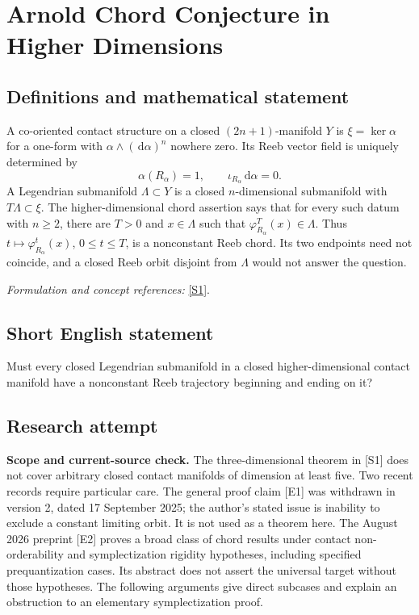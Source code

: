 \documentclass[11pt]{article}
\begin{document}
\section*{\texorpdfstring{Arnold Chord Conjecture in Higher Dimensions}{Arnold Chord Conjecture in Higher Dimensions}}\label{statement}
\subsection{Definitions and mathematical statement}
A co-oriented contact structure on a closed $(2n+1)$-manifold $Y$ is $\xi=\ker\alpha$ for a one-form with $\alpha\wedge({\,\mathrm{d}}\alpha)^n$ nowhere zero. Its Reeb vector field is uniquely determined by
\[
 \alpha(R_\alpha)=1,\qquad \iota_{R_\alpha}{\,\mathrm{d}}\alpha=0.
\]
A Legendrian submanifold $\Lambda\subset Y$ is a closed $n$-dimensional submanifold with $T\Lambda\subset\xi$. The higher-dimensional chord assertion says that for every such datum with $n\ge2$, there are $T>0$ and $x\in\Lambda$ such that $\varphi_{R_\alpha}^T(x)\in\Lambda$. Thus $t\mapsto\varphi_{R_\alpha}^t(x)$, $0\le t\le T$, is a nonconstant Reeb chord. Its two endpoints need not coincide, and a closed Reeb orbit disjoint from $\Lambda$ would not answer the question.
\par\smallskip\textit{Formulation and concept references:} \href{https://arxiv.org/abs/1004.4319}{[S1]}.

\subsection{Short English statement}
Must every closed Legendrian submanifold in a closed higher-dimensional contact manifold have a nonconstant Reeb trajectory beginning and ending on it?
\subsection{Research attempt}
\textbf{Scope and current-source check.}
The three-dimensional theorem in [S1] does not cover arbitrary closed contact
manifolds of dimension at least five.  Two recent records require particular
care.  The general proof claim [E1] was withdrawn in version 2, dated
17 September 2025; the author's stated issue is inability to exclude a
constant limiting orbit.  It is not used as a theorem here.  The August 2026
preprint [E2] proves a broad class of chord results under contact
non-orderability and symplectization rigidity hypotheses, including specified
prequantization cases.  Its abstract does not assert the universal target
without those hypotheses.  The following arguments give direct subcases and
explain an obstruction to an elementary symplectization proof.
\end{document}

